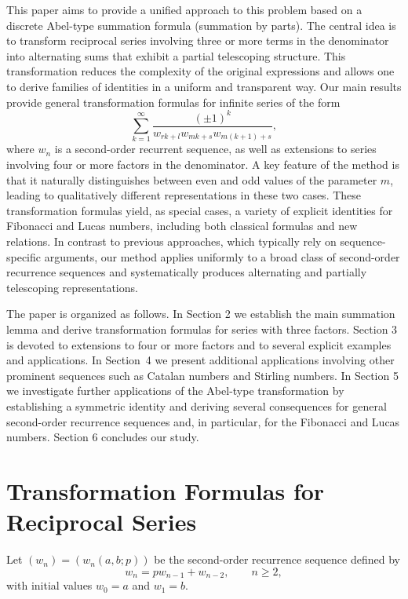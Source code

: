 \documentclass[12pt,reqno]{article}
\begin{document}
This paper aims to provide a unified approach to this problem based on a discrete Abel-type summation formula (summation by parts). 
The central idea is to transform reciprocal series involving three or more terms in the denominator into alternating sums that exhibit a 
partial telescoping structure. This transformation reduces the complexity of the original expressions and allows one to derive families of identities in a uniform and transparent way. Our main results provide general transformation formulas for infinite 
series of the form
	\begin{equation*}
	\sum_{k=1}^{\infty} \frac{(\pm1)^k}{w_{rk+l}  w_{mk+s}  w_{m(k+1)+s}},
	\end{equation*}
where $w_n$ is a second-order recurrent sequence, as well as extensions to series involving four or more factors in the denominator. A key feature of the method is that it naturally distinguishes between even and odd values of the parameter $m$, leading to qualitatively different representations in these two cases. These transformation formulas yield, as special cases, a variety of explicit identities for Fibonacci and Lucas numbers, including both classical formulas and new relations. In contrast to previous approaches, which typically rely on sequence-specific arguments, our method applies uniformly to a broad class of second-order recurrence sequences and systematically produces alternating and partially telescoping representations.

The paper is organized as follows. In Section 2 we establish the main summation lemma and derive transformation formulas for series with three factors. Section 3 is devoted to extensions to four or more factors and to several explicit examples and applications. In Section~4 we present additional applications involving other prominent sequences such as Catalan numbers and Stirling numbers. In Section 5 we investigate further applications of the Abel-type transformation by establishing a symmetric identity and deriving several consequences for general second-order recurrence sequences and, in particular, for the Fibonacci and Lucas numbers. Section 6 concludes our study.


\section{Transformation Formulas for Reciprocal Series}\label{Sect2}

Let $(w_n)=(w_n(a,b;p))$
be the second-order recurrence sequence defined by
\begin{equation*}
	w_n=pw_{n-1}+w_{n-2}, \qquad n\ge2,
	\end{equation*}
with initial values $w_0=a$ and $w_1=b$.
\end{document}
